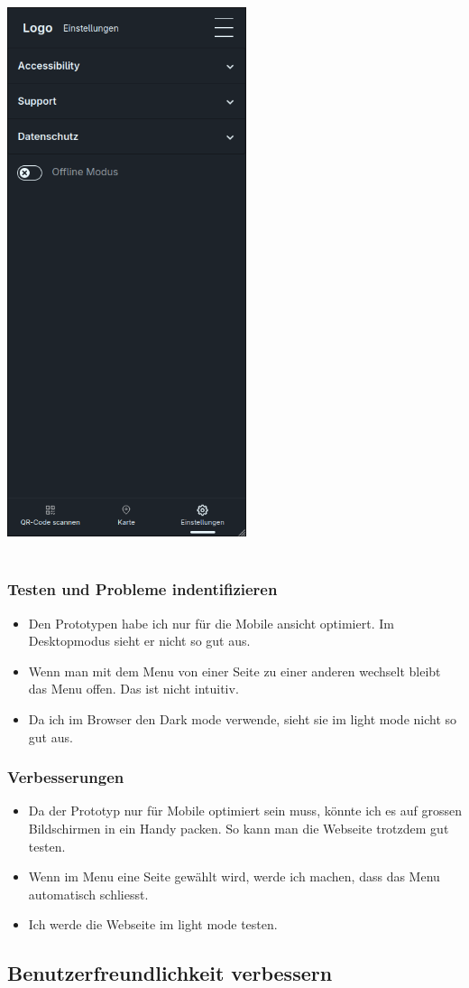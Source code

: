 \documentclass[10pt]{article}
\begin{document}
	\includegraphics[width=7cm]{settingspage}
	\\\\
	\subsubsection{Testen und Probleme indentifizieren}
	\begin{itemize}
		\item Den Prototypen habe ich nur für die Mobile ansicht optimiert. Im Desktopmodus sieht er nicht so gut aus.
		\item Wenn man mit dem Menu von einer Seite zu einer anderen wechselt bleibt das Menu offen. Das ist nicht intuitiv.
		\item Da ich im Browser den Dark mode verwende, sieht sie im light mode nicht so gut aus.
	\end{itemize}
	\subsubsection{Verbesserungen}
	\begin{itemize}
		\item Da der Prototyp nur für Mobile optimiert sein muss, könnte ich es auf grossen Bildschirmen in ein Handy packen. So kann man die Webseite trotzdem gut testen.
		\item Wenn im Menu eine Seite gewählt wird, werde ich machen, dass das Menu automatisch schliesst.
		\item Ich werde die Webseite im light mode testen.
	\end{itemize}
	

	
	
	\subsection{Benutzerfreundlichkeit verbessern}
	

	
\end{document}
